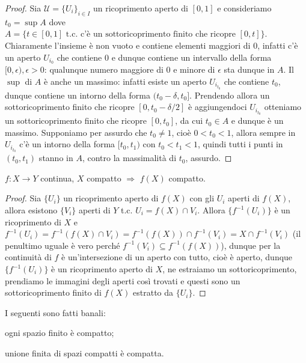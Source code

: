 \begin{proof}
  Sia $\mathcal{U}=\{U_i\}_{i \in I}$ un ricoprimento aperto di $[0, 1]$ e consideriamo $t_0=\sup{A}$ dove $A=\{t \in [0, 1] \text{ t.c. c'è un sottoricoprimento finito che ricopre } [0, t]\}$.
  Chiaramente l'insieme è non vuoto e contiene elementi maggiori di $0$, infatti c'è un aperto $U_{i_0}$ che contiene $0$ e dunque contiene un intervallo della forma $[0, \epsilon), \epsilon>0$: qualunque numero maggiore di $0$ e minore di $\epsilon$ sta dunque in $A$. Il $\sup$ di $A$ è anche un massimo: infatti esiste un aperto $U_{i_{t_0}}$ che contiene $t_0$, dunque contiene un intorno della forma $(t_0-\delta, t_0]$.
  Prendendo allora un sottoricoprimento finito che ricopre $[0, t_0-\delta/2]$ è aggiungendoci $U_{i_{t_0}}$ otteniamo un sottoricoprimento finito che ricopre $[0, t_0]$, da cui $t_0 \in A$ e dunque è un massimo.
  Supponiamo per assurdo che $t_0 \not=1$, cioè $0<t_0<1$, allora sempre in $U_{i_{t_0}}$ c'è un intorno della forma $[t_0, t_1)$ con $t_0<t_1<1$, quindi tutti i punti in $(t_0, t_1)$ stanno in $A$, contro la massimalità di $t_0$, assurdo.
\end{proof}

\begin{thm} \label{cont_comp}
  $f:X \rightarrow Y$ continua, $X$ compatto $\Rightarrow$ $f(X)$ compatto.
\end{thm}

\begin{proof}
  Sia $\{U_i\}$ un ricoprimento aperto di $f(X)$ con gli $U_i$ aperti di $f(X)$, allora esistono $\{V_i\}$ aperti di $Y$ t.c. $U_i=f(X) \cap V_i$.
  Allora $\{f^{-1}(U_i)\}$ è un ricoprimento di $X$ e $f^{-1}(U_i)=f^{-1}(f(X) \cap V_i)=f^{-1}(f(X)) \cap f^{-1}(V_i)=X \cap f^{-1}(V_i)$ (il penultimo uguale è vero perché $f^{-1}(V_i) \subseteq f^{-1}(f(X))$), dunque per la continuità di $f$ è un'intersezione di un aperto con tutto, cioè è aperto, dunque $\{f^{-1}(U_i)\}$ è un ricoprimento aperto di $X$, ne estraiamo un sottoricoprimento, prendiamo le immagini degli aperti così trovati e questi sono un sottoricoprimento finito di $f(X)$ estratto da $\{U_i\}$.
\end{proof}

\begin{ftt}
  I seguenti sono fatti banali:
  \begin{nlist}
    \item ogni spazio finito è compatto;
    \item unione finita di spazi compatti è compatta.
  \end{nlist}
\end{ftt}

